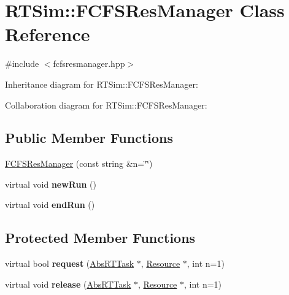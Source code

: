 \hypertarget{classRTSim_1_1FCFSResManager}{}\section{R\+T\+Sim\+:\+:F\+C\+F\+S\+Res\+Manager Class Reference}
\label{classRTSim_1_1FCFSResManager}


{\ttfamily \#include $<$fcfsresmanager.\+hpp$>$}



Inheritance diagram for R\+T\+Sim\+:\+:F\+C\+F\+S\+Res\+Manager\+:


Collaboration diagram for R\+T\+Sim\+:\+:F\+C\+F\+S\+Res\+Manager\+:
\subsection*{Public Member Functions}
\begin{DoxyCompactItemize}
\item 
\hyperlink{classRTSim_1_1FCFSResManager_a6218d861998a22c96f786a10ea09d40b}{F\+C\+F\+S\+Res\+Manager} (const string \&n=\char`\"{}\char`\"{})
\item 
virtual void {\bfseries new\+Run} ()\hypertarget{classRTSim_1_1FCFSResManager_a56adbb601af73bda564101f2866b0162}{}\label{classRTSim_1_1FCFSResManager_a56adbb601af73bda564101f2866b0162}

\item 
virtual void {\bfseries end\+Run} ()\hypertarget{classRTSim_1_1FCFSResManager_a0d5105a9a3c9007e1a45bd100d3c78c4}{}\label{classRTSim_1_1FCFSResManager_a0d5105a9a3c9007e1a45bd100d3c78c4}

\end{DoxyCompactItemize}
\subsection*{Protected Member Functions}
\begin{DoxyCompactItemize}
\item 
virtual bool {\bfseries request} (\hyperlink{classRTSim_1_1AbsRTTask}{Abs\+R\+T\+Task} $\ast$, \hyperlink{classRTSim_1_1Resource}{Resource} $\ast$, int n=1)\hypertarget{classRTSim_1_1FCFSResManager_aedcf172707d544c2f9e7a4e9e916ad1a}{}\label{classRTSim_1_1FCFSResManager_aedcf172707d544c2f9e7a4e9e916ad1a}

\item 
virtual void {\bfseries release} (\hyperlink{classRTSim_1_1AbsRTTask}{Abs\+R\+T\+Task} $\ast$, \hyperlink{classRTSim_1_1Resource}{Resource} $\ast$, int n=1)\hypertarget{classRTSim_1_1FCFSResManager_abf3f45c4bd19a7d73601f8ea6e008956}{}\label{classRTSim_1_1FCFSResManager_abf3f45c4bd19a7d73601f8ea6e008956}

\end{DoxyCompactItemize}
